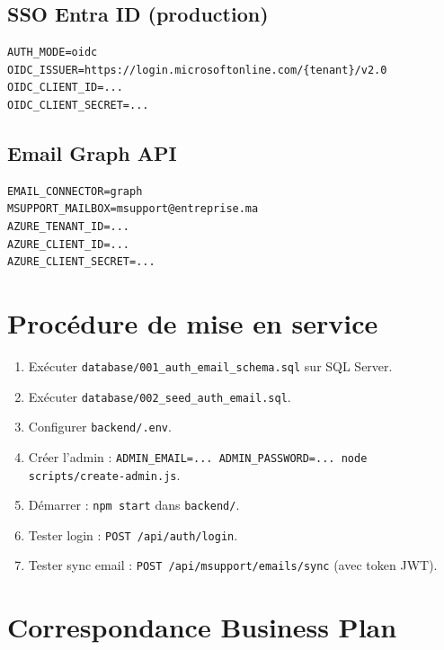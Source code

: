 \documentclass[12pt,a4paper]{article}
\begin{document}
\subsection{SSO Entra ID (production)}
\begin{lstlisting}
AUTH_MODE=oidc
OIDC_ISSUER=https://login.microsoftonline.com/{tenant}/v2.0
OIDC_CLIENT_ID=...
OIDC_CLIENT_SECRET=...
\end{lstlisting}

\subsection{Email Graph API}
\begin{lstlisting}
EMAIL_CONNECTOR=graph
MSUPPORT_MAILBOX=msupport@entreprise.ma
AZURE_TENANT_ID=...
AZURE_CLIENT_ID=...
AZURE_CLIENT_SECRET=...
\end{lstlisting}

\section{Procédure de mise en service}

\begin{enumerate}
  \item Exécuter \texttt{database/001\_auth\_email\_schema.sql} sur SQL Server.
  \item Exécuter \texttt{database/002\_seed\_auth\_email.sql}.
  \item Configurer \texttt{backend/.env}.
  \item Créer l'admin : \texttt{ADMIN\_EMAIL=... ADMIN\_PASSWORD=... node scripts/create-admin.js}.
  \item Démarrer : \texttt{npm start} dans \texttt{backend/}.
  \item Tester login : \texttt{POST /api/auth/login}.
  \item Tester sync email : \texttt{POST /api/msupport/emails/sync} (avec token JWT).
\end{enumerate}

\section{Correspondance Business Plan}
\end{document}
